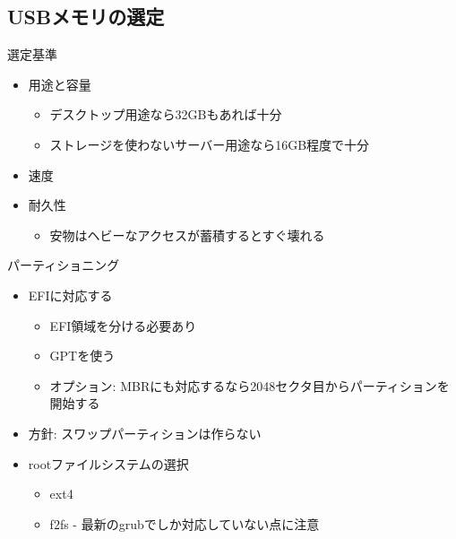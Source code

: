 \subsection{USBメモリの選定}
\begin{frame}[containsverbatim]{選定基準}
  \begin{itemize}
  \item 用途と容量
    \begin{itemize}
    \item デスクトップ用途なら32GBもあれば十分
    \item ストレージを使わないサーバー用途なら16GB程度で十分
    \end{itemize}
  \item 速度
  \item 耐久性
    \begin{itemize}
    \item 安物はヘビーなアクセスが蓄積するとすぐ壊れる
    \end{itemize}
  \end{itemize}
\end{frame}

\begin{frame}[containsverbatim]{パーティショニング}
  \begin{itemize}
  \item EFIに対応する
    \begin{itemize}
    \item EFI領域を分ける必要あり
    \item GPTを使う
    \item オプション: MBRにも対応するなら2048セクタ目からパーティションを開始する
    \end{itemize}
  \item 方針: スワップパーティションは作らない
  \item rootファイルシステムの選択
    \begin{itemize}
    \item ext4
    \item f2fs - 最新のgrubでしか対応していない点に注意
    \end{itemize}
  \end{itemize}
\end{frame}

